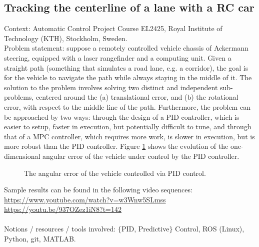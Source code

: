 \subsection{Tracking the centerline of a lane with a RC car}

Context: Automatic Control Project Course EL2425, Royal Institute of
Technology (KTH), Stockholm, Sweden.\\

Problem statement: suppose a remotely controlled vehicle chassis of Ackermann
steering, equipped with a laser rangefinder and a computing unit. Given a
straight path (something that simulates a road lane, e.g. a corridor), the goal
is for the vehicle to navigate the path while always staying in the middle of it.
The solution to the problem involves solving two distinct and independent
sub-problems, centered around the (a) translational error, and (b) the
rotational error, with respect to the middle line of the path. Furthermore, the
problem can be approached by two ways: through the design of a PID controller,
which is easier to setup, faster in execution, but potentially difficult to tune,
and through that of a MPC controller, which requires more work, is slower in
execution, but is more robust than the PID controller. Figure
\ref{fig:centerline_pid_error} shows the evolution of the one-dimensional
angular error of the vehicle under control by the PID controller.

\begin{figure}[H]\centering
  \scalebox{0.6}{}
  \caption{The angular error of the vehicle controlled via PID control.}
  \label{fig:centerline_pid_error}
\end{figure}

\noindent Sample results can be found in the following video sequences:\\
\url{https://www.youtube.com/watch?v=w3Wnw5SLmss}\\
\url{https://youtu.be/937OZez1iN8?t=142}\\\\
Notions / resources / tools involved: $\{$PID, Predictive$\}$ Control, ROS (Linux), Python, git, MATLAB.
